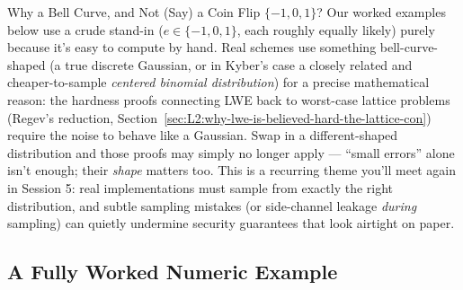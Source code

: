 \begin{center}
\end{center}

\begin{rmkbox}{Why a Bell Curve, and Not (Say) a Coin Flip $\{-1,0,1\}$?}
Our worked examples below use a crude stand-in ($e\in\{-1,0,1\}$, each roughly equally likely) purely because it's easy to compute by hand. Real schemes use something bell-curve-shaped (a true discrete Gaussian, or in Kyber's case a closely related and cheaper-to-sample \emph{centered binomial distribution}) for a precise mathematical reason: the hardness proofs connecting LWE back to worst-case lattice problems (Regev's reduction, Section~\ref{sec:L2:why-lwe-is-believed-hard-the-lattice-con}) require the noise to behave like a Gaussian. Swap in a different-shaped distribution and those proofs may simply no longer apply --- ``small errors'' alone isn't enough; their \emph{shape} matters too. This is a recurring theme you'll meet again in Session 5: real implementations must sample from exactly the right distribution, and subtle sampling mistakes (or side-channel leakage \emph{during} sampling) can quietly undermine security guarantees that look airtight on paper.
\end{rmkbox}

\subsection{A Fully Worked Numeric Example}
\label{sec:L2:a-fully-worked-numeric-example}

